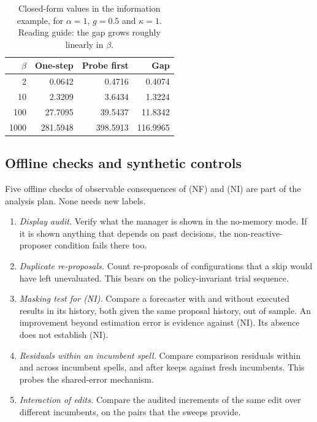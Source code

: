 \begin{table}[t]
\caption{Closed-form values in the information example, for $\alpha=1$, $g=0.5$ and $\kappa=1$. Reading guide: the gap grows roughly linearly in $\beta$.}
\label{tab:ex-info}
\centering
\small
\begin{tabular}{rrrr}
\toprule
$\beta$ & One-step & Probe first & Gap \\
\midrule
2 & 0.0642 & 0.4716 & 0.4074 \\
10 & 2.3209 & 3.6434 & 1.3224 \\
100 & 27.7095 & 39.5437 & 11.8342 \\
1000 & 281.5948 & 398.5913 & 116.9965 \\
\bottomrule
\end{tabular}
\end{table}

\subsection{Offline checks and synthetic controls}

Five offline checks of observable consequences of (NF) and (NI) are part of the analysis plan. None needs new labels.
\begin{enumerate}
\item \emph{Display audit.} Verify what the manager is shown in the no-memory mode. If it is shown anything that depends on past decisions, the non-reactive-proposer condition fails there too.
\item \emph{Duplicate re-proposals.} Count re-proposals of configurations that a skip would have left unevaluated. This bears on the policy-invariant trial sequence.
\item \emph{Masking test for (NI).} Compare a forecaster with and without executed results in its history, both given the same proposal history, out of sample. An improvement beyond estimation error is evidence against (NI). Its absence does not establish (NI).
\item \emph{Residuals within an incumbent spell.} Compare comparison residuals within and across incumbent spells, and after keeps against fresh incumbents. This probes the shared-error mechanism.
\item \emph{Interaction of edits.} Compare the audited increments of the same edit over different incumbents, on the pairs that the sweeps provide.
\end{enumerate}

